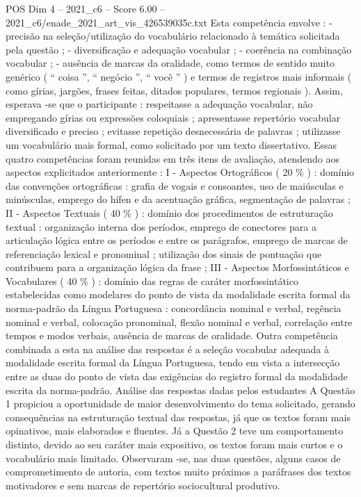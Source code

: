 \begin{textsample}{POS Dim 4 – 2021\_c6 – Score 6.00 – 2021\_c6/enade\_2021\_art\_vis\_426539035c.txt}
Esta competência envolve : - precisão na seleção/utilização do vocabulário relacionado à temática solicitada pela questão ; - diversificação e adequação vocabular ; - coerência na combinação vocabular ; - ausência de marcas da oralidade, como termos de sentido muito genérico ( “ coisa ”, “ negócio ”, “ você ” ) e termos de registros mais informais ( como gírias, jargões, frases feitas, ditados populares, termos regionais ).
Assim, esperava -se que o participante : respeitasse a adequação vocabular, não empregando gírias ou expressões coloquiais ; apresentasse repertório vocabular diversificado e preciso ; evitasse repetição desnecessária de palavras ; utilizasse um vocabulário mais formal, como solicitado por um texto dissertativo.
Essas quatro competências foram reunidas em três itens de avaliação, atendendo aos aspectos explicitados anteriormente : I - Aspectos Ortográficos ( 20 \% ) : domínio das convenções ortográficas : grafia de vogais e consoantes, uso de maiúsculas e minúsculas, emprego do hífen e da acentuação gráfica, segmentação de palavras ; II - Aspectos Textuais ( 40 \% ) : domínio dos procedimentos de estruturação textual : organização interna dos períodos, emprego de conectores para a articulação lógica entre os períodos e entre os parágrafos, emprego de marcas de referenciação lexical e pronominal ; utilização dos sinais de pontuação que contribuem para a organização lógica da frase ; III - Aspectos Morfossintáticos e Vocabulares ( 40 \% ) : domínio das regras de caráter morfossintático estabelecidas como modelares do ponto de vista da modalidade escrita formal da norma-padrão da Língua Portuguesa : concordância nominal e verbal, regência nominal e verbal, colocação pronominal, flexão nominal e verbal, correlação entre tempos e modos verbais, ausência de marcas de oralidade.
Outra competência combinada a esta na análise das respostas é a seleção vocabular adequada à modalidade escrita formal da Língua Portuguesa, tendo em vista a intersecção entre as duas do ponto de vista das exigências do registro formal da modalidade escrita da norma-padrão.
Análise das respostas dadas pelos estudantes A Questão 1 propiciou a oportunidade de maior desenvolvimento do tema solicitado, gerando consequências na estruturação textual das respostas, já que os textos foram mais opinativos, mais elaborados e fluentes.
Já a Questão 2 teve um comportamento distinto, devido ao seu caráter mais expositivo, os textos foram mais curtos e o vocabulário mais limitado.
Observaram -se, nas duas questões, alguns casos de comprometimento de autoria, com textos muito próximos a paráfrases dos textos motivadores e sem marcas de repertório sociocultural produtivo.

\end{textsample}
